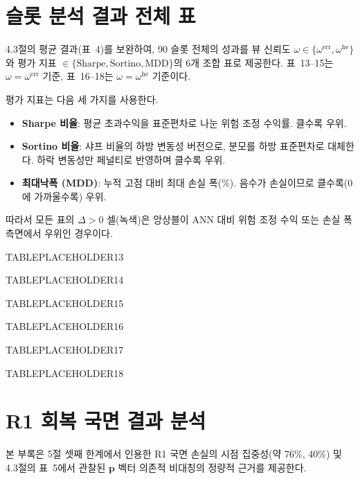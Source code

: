 \documentclass{article}
\begin{document}
\section{슬롯 분석 결과 전체 표}\label{app:result_table}

4.3절의 평균 결과(표~4)를 보완하여, 90 슬롯 전체의 성과를 뷰 신뢰도 $\omega \in \{\omega^{\mathrm{err}}, \omega^{\mathrm{he}}\}$와 평가 지표 $\in \{\text{Sharpe}, \text{Sortino}, \text{MDD}\}$의 6개 조합 표로 제공한다. 표~13--15는 $\omega = \omega^{\mathrm{err}}$ 기준, 표~16--18는 $\omega = \omega^{\mathrm{he}}$ 기준이다.

평가 지표는 다음 세 가지를 사용한다.
\begin{itemize}
  \item \textbf{Sharpe 비율}: 평균 초과수익을 표준편차로 나눈 위험 조정 수익률. 클수록 우위.
  \item \textbf{Sortino 비율}: 샤프 비율의 하방 변동성 버전으로, 분모를 하방 표준편차로 대체한다\citep{sortino1994}. 하락 변동성만 페널티로 반영하며 클수록 우위.
  \item \textbf{최대낙폭 (MDD)}: 누적 고점 대비 최대 손실 폭(\%). 음수가 손실이므로 클수록(0 에 가까울수록) 우위.
\end{itemize}
따라서 모든 표의 $\Delta > 0$ 셀(녹색)은 앙상블이 ANN 대비 위험 조정 수익 또는 손실 폭 측면에서 우위인 경우이다.



TABLEPLACEHOLDER13





TABLEPLACEHOLDER14






TABLEPLACEHOLDER15






TABLEPLACEHOLDER16






TABLEPLACEHOLDER17





TABLEPLACEHOLDER18



\section{R1 회복 국면 결과 분석}\label{app:r1}

본 부록은 5절 셋째 한계에서 인용한 R1 국면 손실의 시점 집중성(약 76\%, 40\%) 및 4.3절의 표~5에서 관찰된 $\mathbf{p}$ 벡터 의존적 비대칭의 정량적 근거를 제공한다.
\end{document}
